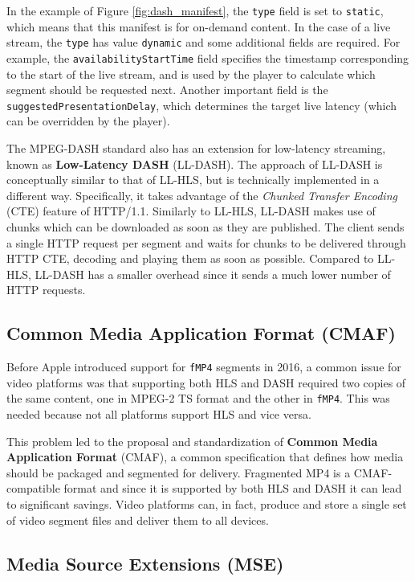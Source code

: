 In the example of Figure \ref{fig:dash_manifest}, the \texttt{type} field is set to \texttt{static}, which means that this manifest is for on-demand content. In the case of a live stream, the \texttt{type} has value \texttt{dynamic} and some additional fields are required. For example, the \texttt{availabilityStartTime} field specifies the timestamp corresponding to the start of the live stream, and is used by the player to calculate which segment should be requested next. Another important field is the \texttt{suggestedPresentationDelay}, which determines the target live latency (which can be overridden by the player).

The MPEG-DASH standard also has an extension for low-latency streaming, known as \textbf{Low-Latency DASH} (LL-DASH). The approach of LL-DASH is conceptually similar to that of LL-HLS, but is technically implemented in a different way. Specifically, it takes advantage of the \textit{Chunked Transfer Encoding} (CTE) feature of HTTP/1.1. Similarly to LL-HLS, LL-DASH makes use of chunks which can be downloaded as soon as they are published. The client sends a single HTTP request per segment and waits for chunks to be delivered through HTTP CTE, decoding and playing them as soon as possible. Compared to LL-HLS, LL-DASH has a smaller overhead since it sends a much lower number of HTTP requests.\cite{llhls_vs_lldash}

\subsection{Common Media Application Format (CMAF)}
\label{sec:bg/technologies/cmaf}

Before Apple introduced support for \texttt{fMP4} segments in 2016, a common issue for video platforms was that supporting both HLS and DASH required two copies of the same content, one in MPEG-2 TS format and the other in \texttt{fMP4}. This was needed because not all platforms support HLS and vice versa.

This problem led to the proposal and standardization of \textbf{Common Media Application Format} (CMAF), a common specification that defines how media should be packaged and segmented for delivery. Fragmented MP4 is a CMAF-compatible format and since it is supported by both HLS and DASH it can lead to significant savings. Video platforms can, in fact, produce and store a single set of video segment files and deliver them to all devices.\cite{cmaf}

\subsection{Media Source Extensions (MSE)}
\label{sec:bg/technologies/mse}

